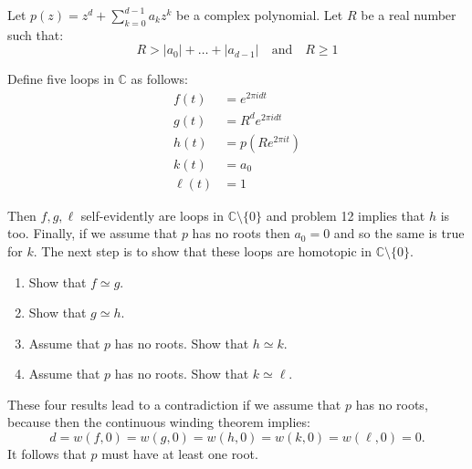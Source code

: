 \documentclass[12 pt, letterpaper]{hmcpset}
\begin{document}
\pagebreak

\begin{problem}
	Let $p(z) = z^{d} + \sum_{k = 0}^{d - 1} a_{k} z^{k}$ be a complex polynomial. Let $R$ be a real number such that:
	\[
		R > \lvert a_{0} \rvert + \dots + \lvert a_{d - 1} \rvert \quad \text{and} \quad R \ge 1
	\]

	Define five loops in $\mathbb{C}$ as follows:
	\begin{align*}
		f(t) & = e^{2\pi i d t} \\
		g(t) & = R^d e^{2\pi i d t} \\
		h(t) & = p(Re^{2\pi i t}) \\
		k(t) & = a_0 \\
		\ell(t) & = 1
	\end{align*}

	Then $f, g, \ell$ self-evidently are loops in $\mathbb{C} \setminus \{ 0 \}$ and problem 12 implies that $h$ is too. Finally, if we assume that $p$  has no roots then $a_{0} = 0$ and so the same is true for $k$. The next step is to show that these loops are homotopic in $\mathbb{C} \setminus \{ 0 \}$.
	\begin{enumerate}
		\item Show that $f \simeq g$.
		\item Show that $g \simeq h$.
		\item Assume that $p$ has no roots. Show that $h \simeq k$.
		\item Assume that $p$ has no roots. Show that $k \simeq \ell$.
	\end{enumerate}

	These four results lead to a contradiction if we assume that $p$ has no roots, because then the continuous winding theorem implies:
	\[
		d = w(f, 0) = w(g, 0) = w(h, 0) = w(k, 0) = w(\ell, 0) = 0.
	\]
	It follows that $p$ must have at least one root.
\end{problem}
\end{document}
